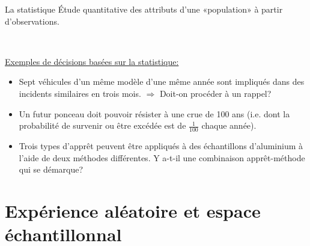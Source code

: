 \documentclass{BeamerTemplate}
\begin{document}
\begin{frame}[t]%
 \begin{Boite}{La statistique}
 Étude  quantitative des attributs d'une «population» à partir  d'observations.
 \end{Boite}

 \medskip
 {\ }

\end{frame}
\begin{frame}[t]%

\underline{Exemples de décisions basées sur la statistique:}

 \begin{itemize}
  \item  Sept véhicules d'un même modèle d'une même   année sont impliqués dans des incidents similaires en trois mois. $\Rightarrow$ Doit-on procéder à   un rappel?
  \item  Un futur ponceau doit pouvoir résister à une crue de 100 ans (i.e. dont la probabilité de survenir ou être excédée est de $\frac{1}{100}$ chaque année).
  \item  Trois types d'apprêt   peuvent être appliqués à des échantillons   d'aluminium  à l'aide de  deux méthodes différentes. Y a-t-il une   combinaison apprêt-méthode  qui se démarque?
 \end{itemize}
\end{frame}


\section[Expérience aléatoire]{Expérience aléatoire et espace échantillonnal}

\end{document}
